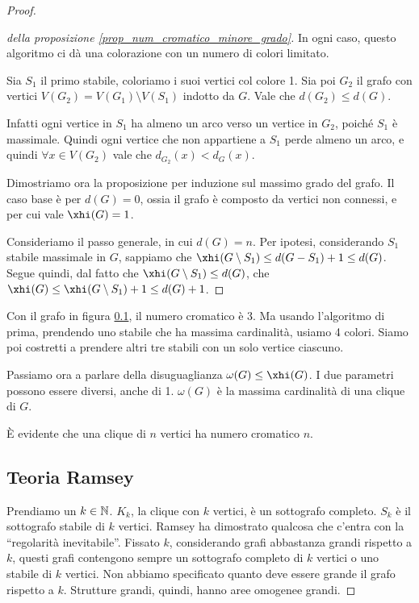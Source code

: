\begin{proof}
\begin{proof}[della proposizione \ref{prop_num_cromatico_minore_grado}]
		In ogni caso, questo algoritmo ci d\`a una colorazione con un numero di colori limitato.

		Sia $S_1$ il primo stabile, coloriamo i suoi vertici col colore 1.
		Sia poi $G_2$ il grafo con vertici $V(G_2) = V(G_1) \setminus V(S_1)$ indotto da $G$.
		Vale che $d(G_2) \le d(G)$.

		Infatti ogni vertice in $S_1$ ha almeno un arco verso un vertice in $G_2$, poich\'e $S_1$ \`e massimale.
		Quindi ogni vertice che non appartiene a $S_1$ perde almeno un arco, e quindi $\forall x \in V(G_2)$ vale che $d_{G_2}(x) < d_G (x)$.

		Dimostriamo ora la proposizione per induzione sul massimo grado del grafo.
		Il caso base \`e per $d(G) = 0$, ossia il grafo \`e composto da vertici non connessi, e per cui vale $\xhi(G) = 1$.

		Consideriamo il passo generale, in cui $d(G) = n$.
		Per ipotesi, considerando $S_1$ stabile massimale in $G$, sappiamo che $\xhi(G \setminus S_1) \le d(G - S_1) + 1 \le d(G)$.
		Segue quindi, dal fatto che $\xhi(G \setminus S_1) \le d(G)$, che $\xhi(G) \le \xhi(G \setminus S_1) + 1 \le d(G) + 1$.
	\end{proof}


	Con il grafo in figura \ref{}, il numero cromatico \`e 3.
	Ma usando l'algoritmo di prima, prendendo uno stabile che ha massima cardinalit\`a, usiamo 4 colori.
	Siamo poi costretti a prendere altri tre stabili con un solo vertice ciascuno.

	Passiamo ora a parlare della disuguaglianza $\omega(G) \le \xhi(G)$.
	I due parametri possono essere diversi, anche di 1.
	$\omega(G)$ \`e la massima cardinalit\`a di una clique di $G$.

	\`E evidente che una clique di $n$ vertici ha numero cromatico $n$.

	\subsection{Teoria Ramsey}

	Prendiamo un $k \in \mathbb{N}$.
	$K_k$, la clique con $k$ vertici, \`e un sottografo completo.
	$S_k$ \`e il sottografo stabile di $k$ vertici.
	Ramsey ha dimostrato qualcosa che c'entra con la ``regolarit\`a inevitabile''.
	Fissato $k$, considerando grafi abbastanza grandi rispetto a $k$, questi grafi contengono sempre un sottografo completo di $k$ vertici o uno stabile di $k$ vertici.
	Non abbiamo specificato quanto deve essere grande il grafo rispetto a $k$.
	Strutture grandi, quindi, hanno aree omogenee grandi.


\end{proof}
